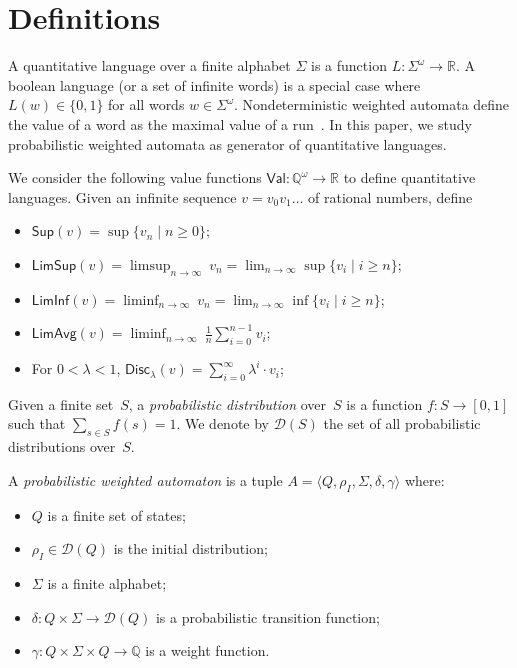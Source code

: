 \documentclass{llncs}
\newcommand{\rat}{{\mathbb Q}}
\newcommand{\real}{{\mathbb R}}
\newcommand{\tuple}[1]{\langle #1 \rangle}
\newcommand{\D}{\mathcal{D}}
\newcommand{\Val}{\mathsf{Val}}
\newcommand{\Max}{\mathsf{Sup}}
\newcommand{\LimSup}{\mathsf{LimSup}}
\newcommand{\LimInf}{\mathsf{LimInf}}
\newcommand{\LimAvg}{\mathsf{LimAvg}}
\newcommand{\Disc}{\mathsf{Disc}}
\newcommand{\weight}{\gamma}
\begin{document}
\section{Definitions}

A quantitative language over a finite alphabet $\Sigma$ is a function $L:\Sigma^{\omega} \to \real$.
A boolean language (or a set of infinite words) is a special case where $L(w) \in \{0,1\}$ for
all words $w \in \Sigma^{\omega}$. Nondeterministic weighted automata define the value of a word 
as the maximal value of a run~\cite{CDH08a}. In this paper, we study probabilistic weighted automata
as generator of quantitative languages.

\smallskip{}
We consider the following value functions $\Val: \rat^\omega \to \real$ to define quantitative languages.
Given an infinite sequence $v=v_0 v_1 \dots$ of rational numbers, define
\begin{itemize}
\item $\Max(v)    = \sup \{v_n \mid n \geq 0\}$;\smallskip
\item $\LimSup(v) = \displaystyle\limsup_{n\to\infty} \ v_n = \lim_{n\to\infty} \sup \{v_i \mid i \geq n\}$;\smallskip
\item $\LimInf(v) = \displaystyle\liminf_{n\to\infty} \ v_n = \lim_{n\to\infty} \inf \{v_i \mid i \geq n\}$;\smallskip
\item $\LimAvg(v) = \displaystyle\liminf_{n\to\infty} \ \frac{1}{n} \sum_{i=0}^{n-1} v_i$;
\item For $0 < \lambda < 1$, $\Disc_{\lambda}(v) = \displaystyle \sum_{i=0}^{\infty} \lambda^i \cdot v_i$;
\end{itemize}

Given a finite set~$S$, a \emph{probabilistic distribution} over~$S$ is
a function $f: S \to [0,1]$ such that $\sum_{s\in S} f(s) = 1$.
We denote by $\D(S)$ the set of all probabilistic distributions over~$S$.

\smallskip{}
A \emph{probabilistic weighted automaton} is a tuple 
$A=\tuple{Q,\rho_I,\Sigma,\delta,\weight}$ where:
\begin{itemize}
\item $Q$ is a finite set of states;
\item $\rho_I \in \D(Q)$ is the initial distribution;
\item $\Sigma$ is a finite alphabet;
\item $\delta: Q \times \Sigma \to \D(Q)$ is a probabilistic transition function;
\item $\weight: Q \times \Sigma \times Q \to \rat$ is a weight function.
\end{itemize}
\end{document}
